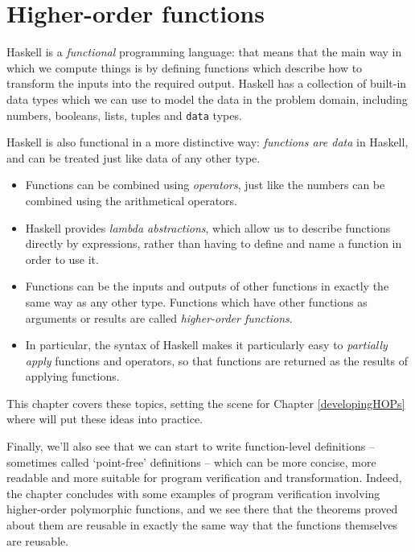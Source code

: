 

\chapter{Higher-order functions}
\chapstart
\label{gen2}

Haskell is a \emph{functional} programming language: that means that the main way in which we compute things is by defining functions which describe how to transform the inputs into the required output. Haskell has a collection of built-in data types which we can use to model the data in the problem domain, including numbers, booleans, lists, tuples and \texttt{data} types.

Haskell is also functional in a more distinctive way: \emph{functions are data} in Haskell, and can be treated just like data of any other type. 
\begin{itemize}
\item
Functions can be combined using \emph{operators}, just like the numbers can be combined using the arithmetical operators.
\item
Haskell provides \emph{lambda abstractions}, which allow us to describe functions directly by expressions, rather than having to define and name a function in order to use it.
\item
Functions can be the inputs and outputs of other functions in exactly the same way as any other type. Functions which have other functions as arguments or results are called \emph{higher-order functions}.
\item
In particular, the syntax of Haskell makes it particularly easy to \emph{partially apply} functions and operators, so that functions are returned as the results of applying functions.
\end{itemize}
This chapter covers these topics, setting the scene for Chapter \ref{developingHOPs} where will put these ideas into practice.

Finally, we'll also see that we can start to write function-level definitions -- sometimes called `point-free' definitions -- which can be more concise, more readable and more suitable for program verification and transformation. Indeed, the chapter concludes with
some examples of program verification involving higher-order polymorphic
functions, and we see there that the theorems proved about them are reusable in
exactly the same way that the functions themselves are reusable.

